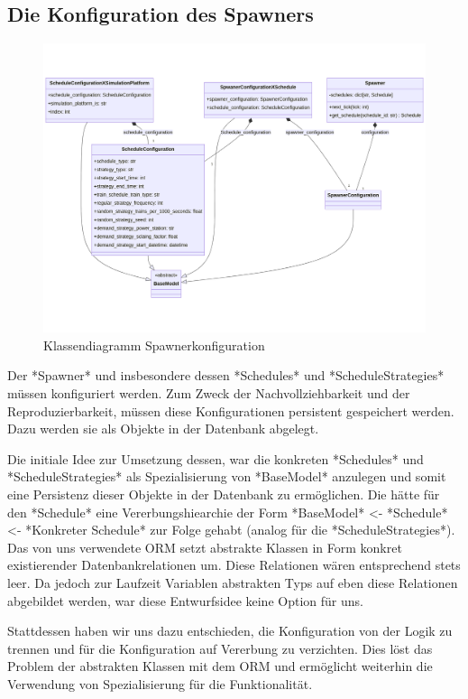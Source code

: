 \subsection{Die Konfiguration des Spawners}

\begin{figure}[!hb]
	\centering
	\includegraphics[width=0.75\linewidth]{images/diagrams/spawner-config-class.png}
	\caption{Klassendiagramm Spawnerkonfiguration}
	\label{fig:spawner-config-class}
\end{figure}

Der *Spawner* und insbesondere dessen *Schedules* und *ScheduleStrategies* müssen konfiguriert werden. Zum Zweck der Nachvollziehbarkeit und der Reproduzierbarkeit, müssen diese Konfigurationen persistent gespeichert werden. Dazu werden sie als Objekte in der Datenbank abgelegt. 

Die initiale Idee zur Umsetzung dessen, war die konkreten *Schedules* und *ScheduleStrategies* als Spezialisierung von *BaseModel* anzulegen und somit eine Persistenz dieser Objekte in der Datenbank zu ermöglichen. Die hätte für den *Schedule* eine Vererbungshiearchie der Form *BaseModel* <- *Schedule* <- *Konkreter Schedule* zur Folge gehabt (analog für die *ScheduleStrategies*). Das von uns verwendete ORM setzt abstrakte Klassen in Form konkret existierender Datenbankrelationen um. Diese Relationen wären entsprechend stets leer. Da jedoch zur Laufzeit Variablen abstrakten Typs auf eben diese Relationen abgebildet werden, war diese Entwurfsidee keine Option für uns.

Stattdessen haben wir uns dazu entschieden, die Konfiguration von der Logik zu trennen und für die Konfiguration auf Vererbung zu verzichten. Dies löst das Problem der abstrakten Klassen mit dem ORM und ermöglicht weiterhin die Verwendung von Spezialisierung für die Funktionalität.

